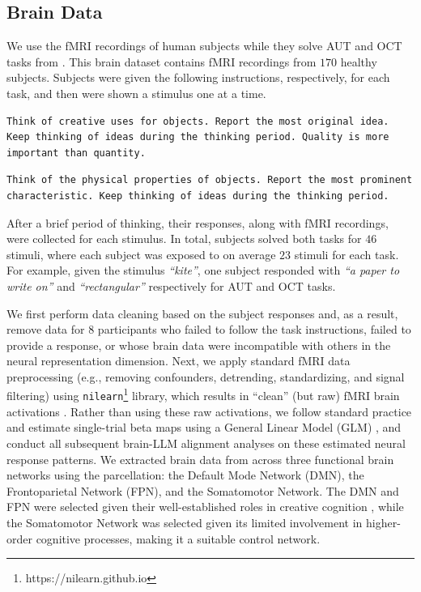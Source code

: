 \subsection{Brain Data}
We use the fMRI recordings of human subjects while they solve AUT and OCT tasks from \citet{beaty2018robust}. This brain dataset contains fMRI recordings from $170$ healthy subjects. Subjects were given the following instructions, respectively, for each task, and then were shown a stimulus one at a time. 

\begin{prompt}[title={AUT Instructions}, label=prompt:aut_instructions]
\begin{Verbatim}[breaklines, breaksymbol={}]
Think of creative uses for objects. Report the most original idea. Keep thinking of ideas during the thinking period. Quality is more important than quantity.
\end{Verbatim}
\end{prompt}

\begin{prompt}[title={OCT Instructions}, label=prompt:oct_instructions]
\begin{Verbatim}[breaklines, breaksymbol={}]
Think of the physical properties of objects. Report the most prominent characteristic. Keep thinking of ideas during the thinking period.
\end{Verbatim}
\end{prompt}

After a brief period of thinking, their responses, along with fMRI recordings, were collected for each stimulus. In total, subjects solved both tasks for $46$ stimuli, where each subject was exposed to on average $23$ stimuli for each task. For example, given the stimulus \textit{``kite''}, one subject responded with \textit{``a paper to write on''} and \textit{``rectangular''} respectively for AUT and OCT tasks. 

We first perform data cleaning based on the subject responses and, as a result, remove data for $8$ participants who failed to follow the task instructions, failed to provide a response, or whose brain data were incompatible with others in the neural representation dimension. Next, we apply standard fMRI data preprocessing (e.g., removing confounders, detrending, standardizing, and signal filtering) using \texttt{nilearn}\footnote{https://nilearn.github.io} library, which results in ``clean'' (but raw) fMRI brain activations \citep{matthews2004functional}. Rather than using these raw activations, we follow standard practice and estimate single-trial beta maps using a General Linear Model (GLM) \citep{draper1998applied}, and conduct all subsequent brain-LLM alignment analyses on these estimated neural response patterns. We extracted brain data from across three functional brain networks using the \citet{yeo2011organization} parcellation: the Default Mode Network (DMN), the Frontoparietal Network (FPN), and the Somatomotor Network. The DMN and FPN were selected given their well-established roles in creative cognition \citep{beaty2016creative, luchini2025role, liu2024neural}, while the Somatomotor Network was selected given its limited involvement in higher-order cognitive processes, making it a suitable control network.

